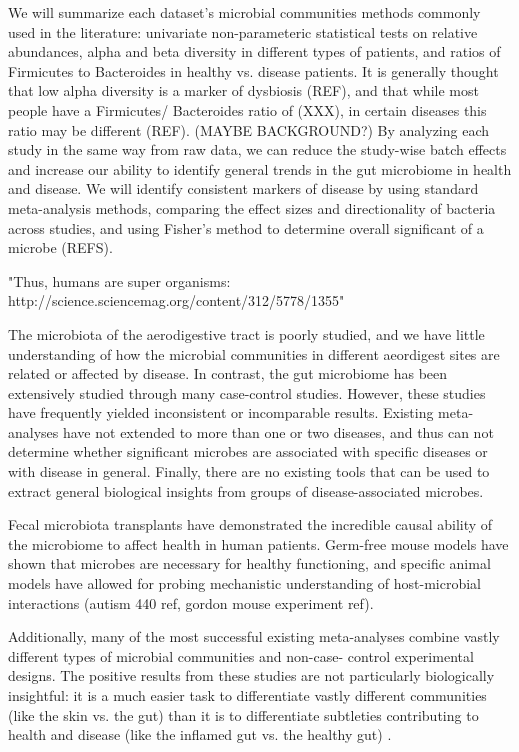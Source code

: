 \documentclass[12pt]{article}
\begin{document}
We will summarize each dataset's microbial communities
methods commonly used in the 
literature: univariate non-parameteric statistical tests on relative 
abundances, alpha and beta diversity in different types of patients, 
and ratios of Firmicutes to Bacteroides in healthy vs. disease 
patients. It is generally thought that low alpha diversity is a marker 
of dysbiosis (REF), and that while most people have a Firmicutes/
Bacteroides ratio of (XXX), in certain diseases this ratio may be 
different (REF). (MAYBE BACKGROUND?) By analyzing each study in the 
same way from raw data, we can reduce the study-wise batch effects and 
increase our ability to identify general trends in the gut microbiome 
in health and disease. We will identify consistent markers of disease 
by using standard meta-analysis methods, comparing the effect sizes 
and directionality of bacteria across studies, and using Fisher's 
method to determine overall significant of a microbe (REFS). 

"Thus, humans are super organisms: http://science.sciencemag.org/content/312/5778/1355"

The microbiota of 
the aerodigestive tract is poorly studied, and we have little understanding 
of how the microbial communities in different aeordigest sites are related or 
affected by disease. In contrast, the gut microbiome has 
been extensively studied through many case-control studies. 
However, these studies have frequently yielded inconsistent or incomparable 
results. Existing meta-analyses have not extended to more than one or two 
diseases, and thus can not determine whether significant microbes are 
associated with specific diseases or with disease in general. 
Finally, there are no existing tools that can be used to extract general 
biological insights from groups of disease-associated microbes.

Fecal microbiota transplants have demonstrated the incredible
causal ability of the microbiome to affect health in 
human patients. Germ-free mouse models have shown that microbes are
necessary for healthy functioning, and specific animal models have  
allowed for probing mechanistic understanding of host-microbial 
interactions (autism 440 ref, gordon mouse experiment ref). 

Additionally, many of the most successful existing meta-analyses 
combine vastly different types of microbial communities and non-case-
control experimental designs. The positive results from these studies 
are not particularly biologically insightful: it is a much easier task 
to differentiate vastly different communities (like the skin vs. the 
gut) than it is to differentiate subtleties contributing to health and 
disease (like the inflamed gut vs. the healthy gut) \cite{knights-supervised-2010}.
\end{document}
